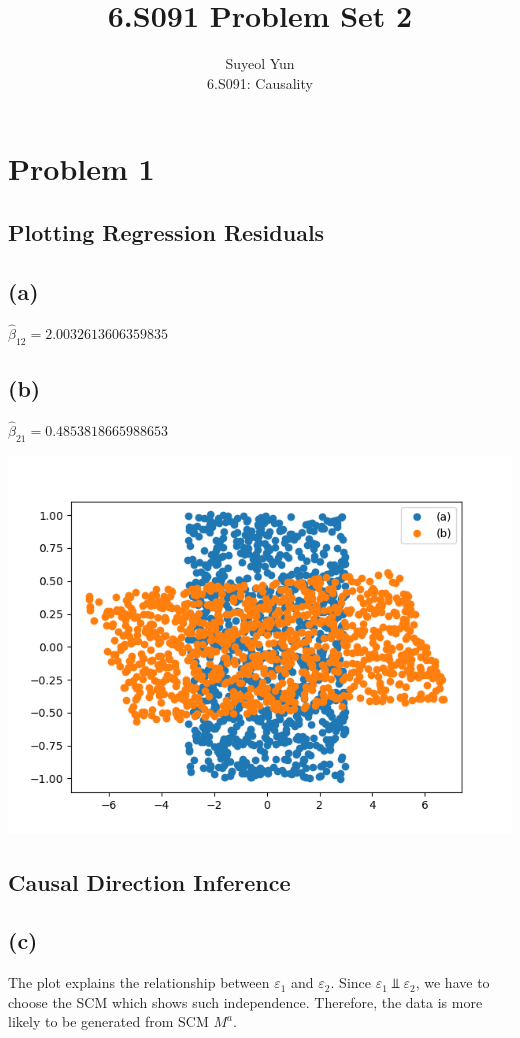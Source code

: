 \documentclass[10pt]{article}
\begin{document}
 
\title{6.S091 Problem Set 2}
\author{Suyeol Yun\\
6.S091: Causality}
\maketitle
 
\section{Problem 1}
\subsection{Plotting Regression Residuals}
\subsection{(a)} $\hat{\beta}_{12} = 2.0032613606359835$
\subsection{(b)} $\hat{\beta}_{21} = 0.4853818665988653$

\includegraphics{images/problem1.png}

\subsection{Causal Direction Inference}

\subsection{(c)}
The plot explains the relationship between $\varepsilon_1$ and $\varepsilon_2$. Since $\varepsilon_1 \Perp \varepsilon_2$, we have to choose the SCM which shows such independence. Therefore, the data is more likely to be generated from SCM $M^a$.
\end{document}
